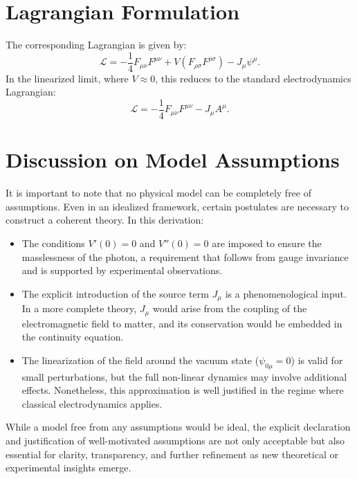 \documentclass{article}
\begin{document}
	\section{Lagrangian Formulation}
	The corresponding Lagrangian is given by:
	\[
	\mathcal{L} = -\frac{1}{4} F_{\mu\nu} F^{\mu\nu} + V(F_{\rho\sigma} F^{\rho\sigma}) - J_\mu \psi^\mu.
	\]
	In the linearized limit, where \(V \approx 0\), this reduces to the standard electrodynamics Lagrangian:
	\[
	\mathcal{L} = -\frac{1}{4} F_{\mu\nu} F^{\mu\nu} - J_\mu A^\mu.
	\]
	
	\section{Discussion on Model Assumptions}
	It is important to note that no physical model can be completely free of assumptions. Even in an idealized framework, certain postulates are necessary to construct a coherent theory. In this derivation:
	\begin{itemize}
		\item The conditions \(V'(0) = 0\) and \(V''(0) = 0\) are imposed to ensure the masslessness of the photon, a requirement that follows from gauge invariance and is supported by experimental observations.
		\item The explicit introduction of the source term \(J_\mu\) is a phenomenological input. In a more complete theory, \(J_\mu\) would arise from the coupling of the electromagnetic field to matter, and its conservation would be embedded in the continuity equation.
		\item The linearization of the field around the vacuum state (\(\psi_{0\mu} = 0\)) is valid for small perturbations, but the full non-linear dynamics may involve additional effects. Nonetheless, this approximation is well justified in the regime where classical electrodynamics applies.
	\end{itemize}
	While a model free from any assumptions would be ideal, the explicit declaration and justification of well-motivated assumptions are not only acceptable but also essential for clarity, transparency, and further refinement as new theoretical or experimental insights emerge.
	
\end{document}

